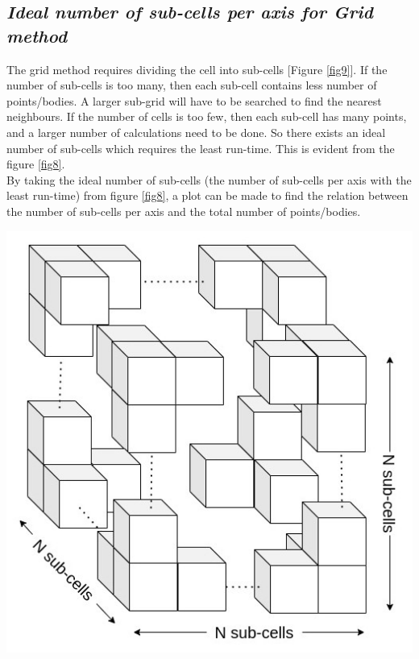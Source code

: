 \documentclass[twocolumn,11pt]{article}
\begin{document}
\begin{multicols}{2}
\subsection{\textit{Ideal number of sub-cells per axis for Grid method}}
The grid method requires dividing the cell into sub-cells [Figure \ref{fig9}]. If the number of sub-cells is too many, then each sub-cell contains less number of points/bodies. A larger sub-grid will have to be searched to find the nearest neighbours. If the number of cells is too few, then each sub-cell has many points, and a larger number of calculations need to be done. So there exists an ideal number of sub-cells which requires the least run-time. This is evident from the figure \ref{fig8}.\\

By taking the ideal number of sub-cells (the number of sub-cells per axis with the least run-time) from figure \ref{fig8}, a plot can be made to find the relation between the number of sub-cells per axis and the total number of points/bodies.


\begin{center}
  \includegraphics[width=0.9\linewidth]{gridn}
  \label{fig9}
\end{center}

\end{multicols}
\twocolumn
\end{document}
